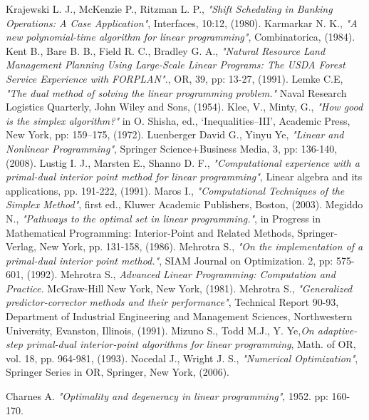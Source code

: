 \documentclass[a4paper,10 pt,titlepage,twoside]{book}
\theoremstyle{plain}
\theoremstyle{definition}
\theoremstyle{remark}
\begin{document}
\begin{thebibliography}{9}
		Krajewski L. J., McKenzie P., Ritzman L. P., \textit{ "Shift Scheduling in Banking Operations: A Case Application"}, Interfaces, 10:12, (1980).
		 Karmarkar N. K.,\emph{ "A new polynomial-time algorithm for linear programming"}, Combinatorica, (1984).
		 Kent B., Bare B. B., Field R. C., Bradley G. A., \textit{"Natural Resource Land Management Planning Using Large-Scale Linear Programs: The USDA Forest Service Experience with FORPLAN".}, OR, 39, pp: 13-27, (1991).
		 Lemke C.E, \textit{ "The dual method of solving the linear programming problem."} Naval Research Logistics Quarterly, John Wiley and Sons, (1954).
		 Klee, V., Minty, G., \emph{ "How good is the simplex algorithm?"} in O. Shisha, ed., ‘Inequalities–III’, Academic Press, New York, pp: 159–175, (1972).
		Luenberger David G., Yinyu Ye, \emph{"Linear and Nonlinear Programming"}, Springer Science+Business Media, 3, pp: 136-140, (2008).
		 Lustig I. J., Marsten E., Shanno D. F., \emph{ "Computational experience with a primal-dual interior point method for linear programming"}, Linear algebra and its applications, pp. 191-222, (1991).
		 Maros I., \emph{ "Computational Techniques of the Simplex Method"}, first ed., Kluwer
		Academic Publishers, Boston, (2003).
		 Megiddo N., \emph{ "Pathways to the optimal set in linear programming."}, in Progress in Mathematical Programming: Interior-Point and Related Methods, Springer-Verlag, New York, pp. 131-158, (1986).
	 Mehrotra S., \emph{ "On the implementation of a primal-dual interior point method."}, SIAM Journal on Optimization. 2, pp: 575-601, (1992).
	 Mehrotra S., \emph{ Advanced Linear Programming: Computation and
	Practice. } McGraw-Hill New York, New York, (1981).
 Mehrotra S., \emph{"Generalized predictor-corrector methods and their performance"}, Technical Report 90-93, Department of Industrial Engineering and Management Sciences, Northwestern University, Evanston, Illinois, (1991).
		Mizuno S., Todd M.J., Y. Ye,\emph{\;On adaptive-step primal-dual interior-point algorithms for linear programming}, Math. of OR, vol. 18, pp. 964-981, (1993). 
	Nocedal J., Wright J. S., \emph{\;"Numerical Optimization"}, Springer Series in OR, Springer, New York, (2006).

	  Charnes A. \emph{ "Optimality and degeneracy in linear programming"}, 1952. pp: 160-170. 


\end{thebibliography}
\end{document}
